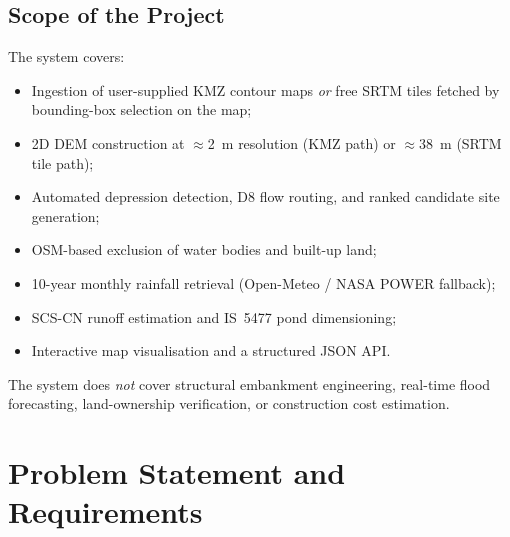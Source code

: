 \documentclass[manuscript,screen,review,nonacm]{acmart}
\begin{document}
\subsection{Scope of the Project}

The system covers:
\begin{itemize}
  \item Ingestion of user-supplied KMZ contour maps \emph{or} free SRTM
        tiles fetched by bounding-box selection on the map;
  \item 2D DEM construction at $\approx$2~m resolution (KMZ path) or
        $\approx$38~m (SRTM tile path);
  \item Automated depression detection, D8 flow routing, and ranked
        candidate site generation;
  \item OSM-based exclusion of water bodies and built-up land;
  \item 10-year monthly rainfall retrieval (Open-Meteo / NASA POWER
        fallback);
  \item SCS-CN runoff estimation and IS~5477 pond dimensioning;
  \item Interactive map visualisation and a structured JSON API.
\end{itemize}

The system does \emph{not} cover structural embankment engineering,
real-time flood forecasting, land-ownership verification, or construction
cost estimation.

\section{Problem Statement and Requirements}
\label{sec:requirements}
\end{document}
